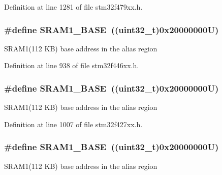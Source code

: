 Definition at line 1281 of file stm32f479xx.\+h.

\subsubsection[{\texorpdfstring{S\+R\+A\+M1\+\_\+\+B\+A\+SE}{SRAM1_BASE}}]{\setlength{\rightskip}{0pt plus 5cm}\#define S\+R\+A\+M1\+\_\+\+B\+A\+SE~((uint32\+\_\+t)0x20000000\+U)}\hypertarget{group___peripheral__memory__map_ga7d0fbfb8894012dbbb96754b95e562cd}{}\label{group___peripheral__memory__map_ga7d0fbfb8894012dbbb96754b95e562cd}
S\+R\+A\+M1(112 K\+B) base address in the alias region 

Definition at line 938 of file stm32f446xx.\+h.

\subsubsection[{\texorpdfstring{S\+R\+A\+M1\+\_\+\+B\+A\+SE}{SRAM1_BASE}}]{\setlength{\rightskip}{0pt plus 5cm}\#define S\+R\+A\+M1\+\_\+\+B\+A\+SE~((uint32\+\_\+t)0x20000000\+U)}\hypertarget{group___peripheral__memory__map_ga7d0fbfb8894012dbbb96754b95e562cd}{}\label{group___peripheral__memory__map_ga7d0fbfb8894012dbbb96754b95e562cd}
S\+R\+A\+M1(112 K\+B) base address in the alias region 

Definition at line 1007 of file stm32f427xx.\+h.

\subsubsection[{\texorpdfstring{S\+R\+A\+M1\+\_\+\+B\+A\+SE}{SRAM1_BASE}}]{\setlength{\rightskip}{0pt plus 5cm}\#define S\+R\+A\+M1\+\_\+\+B\+A\+SE~((uint32\+\_\+t)0x20000000\+U)}\hypertarget{group___peripheral__memory__map_ga7d0fbfb8894012dbbb96754b95e562cd}{}\label{group___peripheral__memory__map_ga7d0fbfb8894012dbbb96754b95e562cd}
S\+R\+A\+M1(112 K\+B) base address in the alias region 

